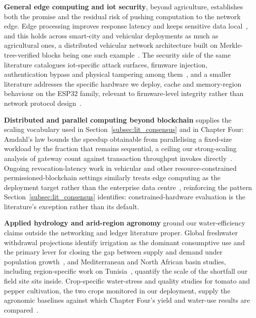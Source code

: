 \documentclass[12pt,a4paper,oneside]{book}
\begin{document}
\textbf{General edge computing and \gls{iot} security}, beyond agriculture,
establishes both the promise and the residual risk of pushing computation
to the network edge. Edge processing improves response latency and keeps
sensitive data local~\cite{sharma2020edge, liu2019edge, wang2021edge}, and
this holds across smart-city and vehicular deployments as much as
agricultural ones, a distributed vehicular network architecture built on
Merkle-tree-verified blocks being one such
example~\cite{sharma2018merkle}. The security side of the same literature
catalogues \gls{iot}-specific attack surfaces, firmware injection,
authentication bypass and physical tampering among
them~\cite{hassan2019iotSecurity, dorri2017blockchain, kalaimathi2025injection, akande2018iotChallenges, knight2025iotResilience, bashir2023IoTWear}, and a smaller literature addresses the specific
hardware we deploy, cache and memory-region behaviour on the
ESP32 family, relevant to firmware-level integrity rather than network
protocol design~\cite{kumari2025rom, csdn_esp32s3_cache, esp_hal_cache}.

\textbf{Distributed and parallel computing beyond blockchain} supplies the
scaling vocabulary used in Section~\ref{subsec:lit_consensus} and in
Chapter Four: Amdahl's law bounds the speedup obtainable from
parallelising a fixed-size workload by the fraction that remains
sequential, a ceiling our strong-scaling analysis of gateway
count against transaction throughput invokes
directly~\cite{amdahl1967validity}. Ongoing revocation-latency work in
vehicular and other resource-constrained permissioned-blockchain settings
similarly treats edge computing as the deployment target rather than the
enterprise data centre~\cite{lu2022revocation}, reinforcing the pattern
Section~\ref{subsec:lit_consensus} identifies: constrained-hardware
evaluation is the literature's exception rather than its default.

\textbf{Applied hydrology and arid-region agronomy} ground our
water-efficiency claims outside the networking and ledger literature
proper. Global freshwater withdrawal projections identify irrigation as
the dominant consumptive use and the primary lever for closing the gap
between supply and demand under
population growth~\cite{fao2050, un_water2023}, and Mediterranean and North
African basin studies, including region-specific work on
Tunisia~\cite{tunisia_water_report, adeloye2021tunisiaAgro, benali2024tunisiaWater}, quantify the scale of the
shortfall our field site sits inside. Crop-specific water-stress
and quality studies for tomato and pepper cultivation, the two crops
monitored in our deployment, supply the agronomic baselines
against which Chapter Four's yield and water-use results are
compared~\cite{mdpi_tunisia_tomato, jaeid_pepper, fao_tomato_guide, safeer2024tomato, wang2025pepper, tia2020waterstress, pepper2021moisturecontrol, capsicumspacing2017study, precision2020yield, pepperquality2019irrigation}.
\end{document}
